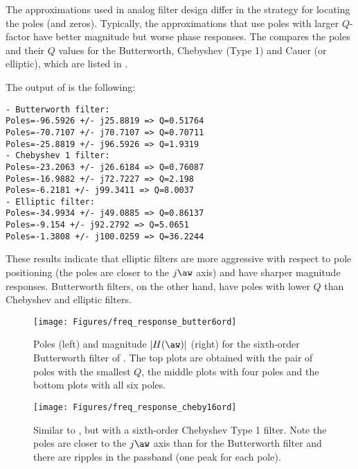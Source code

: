 The approximations used in analog filter design differ in the strategy for locating the poles (and zeros). Typically, the approximations that use poles with larger $Q$-factor have better magnitude but worse phase responses. The  compares the poles and their $Q$ values for the Butterworth, Chebyshev (Type 1) and Cauer (or elliptic), which are listed
in .


The output of  is the following:
\begin{verbatim}
- Butterworth filter:
Poles=-96.5926 +/- j25.8819 => Q=0.51764
Poles=-70.7107 +/- j70.7107 => Q=0.70711
Poles=-25.8819 +/- j96.5926 => Q=1.9319
- Chebyshev 1 filter:
Poles=-23.2063 +/- j26.6184 => Q=0.76087
Poles=-16.9882 +/- j72.7227 => Q=2.198
Poles=-6.2181 +/- j99.3411 => Q=8.0037
- Elliptic filter:
Poles=-34.9934 +/- j49.0885 => Q=0.86137
Poles=-9.154 +/- j92.2792 => Q=5.0651
Poles=-1.3808 +/- j100.0259 => Q=36.2244
\end{verbatim}
These results indicate that elliptic filters are more aggressive with respect to pole positioning (the poles are closer to the $j \aw$ axis) and have sharper magnitude responses. Butterworth filters, on the other hand, have poles with lower $Q$ than Chebyshev and elliptic filters.


\begin{figure}
\centering
\texttt{[image: Figures/freq\_response\_butter6ord]}
\caption[{Poles (left) and magnitude $|H(\aw)|$ (right) for the sixth-order Butterworth filter of .}]{Poles (left) and magnitude $|H(\aw)|$ (right) for the sixth-order Butterworth filter of . The top plots are obtained with the pair of poles with the smallest $Q$, the middle plots with four poles and the bottom plots with all six poles.\label{fig:freq_response_butter6ord}}
\end{figure}

\begin{figure}
\centering
\texttt{[image: Figures/freq\_response\_cheby16ord]}
\caption[{Similar to , but with a sixth-order Chebyshev Type 1 filter.}]{Similar to , but with a sixth-order Chebyshev Type 1 filter. Note the poles are closer to the $j \aw$ axis than for the Butterworth filter and there are ripples in the passband (one peak for each pole).\label{fig:freq_response_cheby16ord}}
\end{figure}

